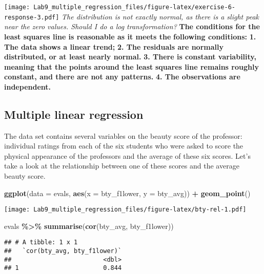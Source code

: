 \documentclass[
]{article}
\newenvironment{Shaded}{\begin{snugshade}}{\end{snugshade}}
\newcommand{\AttributeTok}[1]{\textcolor[rgb]{0.13,0.29,0.53}{#1}}
\newcommand{\FunctionTok}[1]{\textcolor[rgb]{0.13,0.29,0.53}{\textbf{#1}}}
\newcommand{\NormalTok}[1]{#1}
\newcommand{\SpecialCharTok}[1]{\textcolor[rgb]{0.81,0.36,0.00}{\textbf{#1}}}
\begin{document}
\texttt{[image: Lab9\_multiple\_regression\_files/figure-latex/exercise-6-response-3.pdf]}
\emph{The distribution is not exactly normal, as there is a slight peak
near the} \emph{zero values. Should I do a log transformation?}
\textbf{The conditions for the least squares line is reasonable as it
meets the} \textbf{following conditions: } \textbf{1. The data shows a
linear trend;} \textbf{2. The residuals are normally distributed, or at
least nearly normal.} \textbf{3. There is constant variability, meaning
that the points around the least} \textbf{squares line remains roughly
constant, and there are not any patterns.} \textbf{4. The observations
are independent.}

\subsection{Multiple linear
regression}\label{multiple-linear-regression}

The data set contains several variables on the beauty score of the
professor: individual ratings from each of the six students who were
asked to score the physical appearance of the professors and the average
of these six scores. Let's take a look at the relationship between one
of these scores and the average beauty score.

\begin{Shaded}
\begin{Highlighting}[]
\FunctionTok{ggplot}\NormalTok{(}\AttributeTok{data =}\NormalTok{ evals, }\FunctionTok{aes}\NormalTok{(}\AttributeTok{x =}\NormalTok{ bty\_f1lower, }\AttributeTok{y =}\NormalTok{ bty\_avg)) }\SpecialCharTok{+}
  \FunctionTok{geom\_point}\NormalTok{()}
\end{Highlighting}
\end{Shaded}

\texttt{[image: Lab9\_multiple\_regression\_files/figure-latex/bty-rel-1.pdf]}

\begin{Shaded}
\begin{Highlighting}[]
\NormalTok{evals }\SpecialCharTok{\%\textgreater{}\%} 
  \FunctionTok{summarise}\NormalTok{(}\FunctionTok{cor}\NormalTok{(bty\_avg, bty\_f1lower))}
\end{Highlighting}
\end{Shaded}

\begin{verbatim}
## # A tibble: 1 x 1
##   `cor(bty_avg, bty_f1lower)`
##                         <dbl>
## 1                       0.844
\end{verbatim}
\end{document}
